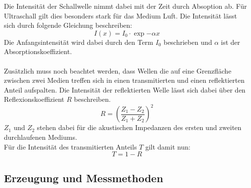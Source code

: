 \noindent
Die Intensität der Schallwelle nimmt dabei mit der Zeit durch Absoption ab. 
Für Ultraschall gilt dies besonders stark für das Medium Luft.
Die Intensität lässt sich durch folgende Gleichung beschreiben:
\begin{equation*}
  I(x)=I_0\cdot \exp{-\alpha x}  
\end{equation*}
Die Anfangsintensität wird dabei durch den Term $I_0$ beschrieben und $\alpha$ ist der Absorptionskoeffizient.\\\\
Zusätzlich muss noch beachtet werden, dass Wellen die auf eine Grenzfläche zwischen zwei Medien treffen sich in einen transmitierten und einen reflektierten Anteil aufspalten.
Die Intensität der reflektierten Welle lässt sich dabei über den Reflexionskoeffizient $R$ beschreiben.
\begin{equation*}
    R=\left(\frac{Z_1-Z_2}{Z_1+Z_2}\right)^2
\end{equation*}
$Z_1$ und $Z_2$ stehen dabei für die akustischen Impedanzen des ersten und zweiten durchlaufenen Mediums.\\
Für die Intensität des transmitierten Anteils $T$ gilt damit nun:
\begin{equation*}
    T=1-R
\end{equation*}




\subsection{Erzeugung und Messmethoden}


